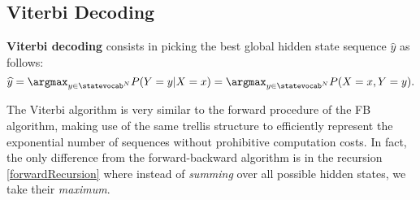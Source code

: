 
%


\subsection{Viterbi Decoding}\label{viterbi}


\textbf{Viterbi decoding} consists in
picking the best global hidden state sequence 
$\widehat{y}$
as follows: 
\begin{equation}
\widehat{y} = \argmax_{y \in \statevocab^N} P(Y=y|X=x) = \argmax_{y \in \statevocab^N} P(X=x,Y=y).
\end{equation}

The Viterbi algorithm 
is very similar to the forward procedure of the FB algorithm,
making use of the same trellis structure to efficiently represent the exponential number of sequences without prohibitive computation costs. In fact, the only
difference from the forward-backward algorithm is in the recursion
\ref{forwardRecursion} where instead of \emph{summing} over all possible 
hidden states, we take their \emph{maximum}.

